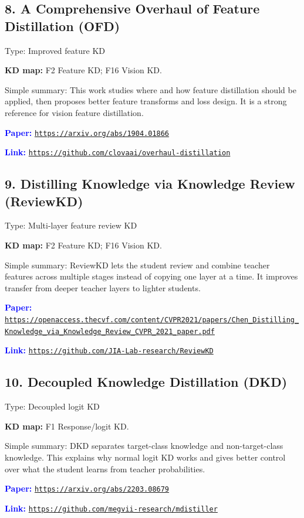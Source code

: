 \documentclass[10pt]{article}
\begin{document}
\subsection*{8. A Comprehensive Overhaul of Feature Distillation (OFD)}
Type: Improved feature KD\par
\textbf{KD map:} F2 Feature KD; F16 Vision KD.\par
Simple summary: This work studies where and how feature distillation should be applied, then proposes better feature transforms and loss design. It is a strong reference for vision feature distillation.\par
\textcolor{blue}{\textbf{Paper:}} \href{https://arxiv.org/abs/1904.01866}{\nolinkurl{https://arxiv.org/abs/1904.01866}}\par
\textcolor{blue}{\textbf{Link:}} \href{https://github.com/clovaai/overhaul-distillation}{\nolinkurl{https://github.com/clovaai/overhaul-distillation}}\par

\subsection*{9. Distilling Knowledge via Knowledge Review (ReviewKD)}
Type: Multi-layer feature review KD\par
\textbf{KD map:} F2 Feature KD; F16 Vision KD.\par
Simple summary: ReviewKD lets the student review and combine teacher features across multiple stages instead of copying one layer at a time. It improves transfer from deeper teacher layers to lighter students.\par
\textcolor{blue}{\textbf{Paper:}} \href{https://openaccess.thecvf.com/content/CVPR2021/papers/Chen_Distilling_Knowledge_via_Knowledge_Review_CVPR_2021_paper.pdf}{\nolinkurl{https://openaccess.thecvf.com/content/CVPR2021/papers/Chen_Distilling_Knowledge_via_Knowledge_Review_CVPR_2021_paper.pdf}}\par
\textcolor{blue}{\textbf{Link:}} \href{https://github.com/JIA-Lab-research/ReviewKD}{\nolinkurl{https://github.com/JIA-Lab-research/ReviewKD}}\par

\subsection*{10. Decoupled Knowledge Distillation (DKD)}
Type: Decoupled logit KD\par
\textbf{KD map:} F1 Response/logit KD.\par
Simple summary: DKD separates target-class knowledge and non-target-class knowledge. This explains why normal logit KD works and gives better control over what the student learns from teacher probabilities.\par
\textcolor{blue}{\textbf{Paper:}} \href{https://arxiv.org/abs/2203.08679}{\nolinkurl{https://arxiv.org/abs/2203.08679}}\par
\textcolor{blue}{\textbf{Link:}} \href{https://github.com/megvii-research/mdistiller}{\nolinkurl{https://github.com/megvii-research/mdistiller}}\par
\end{document}
